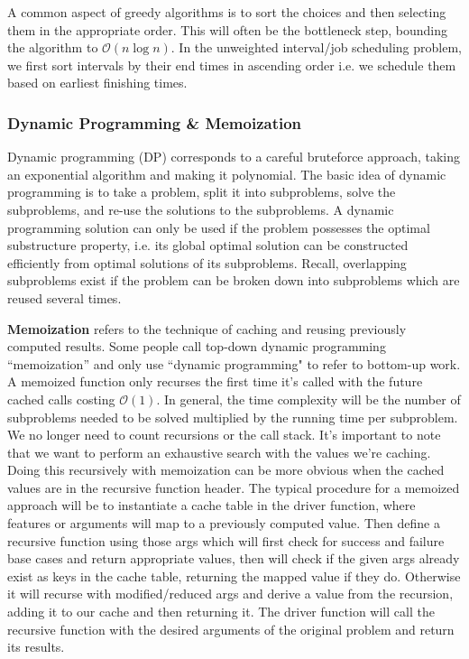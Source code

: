 \documentclass{article}
\newcommand{\bigO}{\mathcal{O}}
\begin{document}
    A common aspect of greedy algorithms is to sort the choices and then selecting them in the appropriate order. This will often be the bottleneck step, bounding the algorithm to $\bigO(n \log n)$. In the unweighted interval/job scheduling problem, we first sort intervals by their end times in ascending order i.e. we schedule them based on earliest finishing times.  
    
    \subsubsection{Dynamic Programming \& Memoization}
    Dynamic programming (DP) corresponds to a careful bruteforce approach, taking an exponential algorithm and making it polynomial. The basic idea of dynamic programming is to take a problem, split it into subproblems, solve the subproblems, and re-use the solutions to the subproblems. A dynamic programming solution can only be used if the problem possesses the optimal substructure property, i.e. its global optimal solution can be constructed efficiently from optimal solutions of its subproblems. Recall, overlapping subproblems exist if the problem can be broken down into subproblems which are reused several times. 
    
    \textbf{Memoization} refers to the technique of caching and reusing previously computed results. Some people call top-down dynamic programming ``memoization'' and only use ``dynamic programming" to refer to bottom-up work. A memoized function only recurses the first time it's called with the future cached calls costing $\bigO(1)$. In general, the time complexity will be the number of subproblems needed to be solved multiplied by the running time per subproblem. We no longer need to count recursions or the call stack. It's important to note that we want to perform an exhaustive search with the values we're caching. Doing this recursively with memoization can be more obvious when the cached values are in the recursive function header. The typical procedure for a memoized approach will be to instantiate a cache table in the driver function, where features or arguments will map to a previously computed value. Then define a recursive function using those args which will first check for success and failure base cases and return appropriate values, then will check if the given args already exist as keys in the cache table, returning the mapped value if they do. Otherwise it will recurse with modified/reduced args and derive a value from the recursion, adding it to our cache and then returning it. The driver function will call the recursive function with the desired arguments of the original problem and return its results.
    
\end{document}
